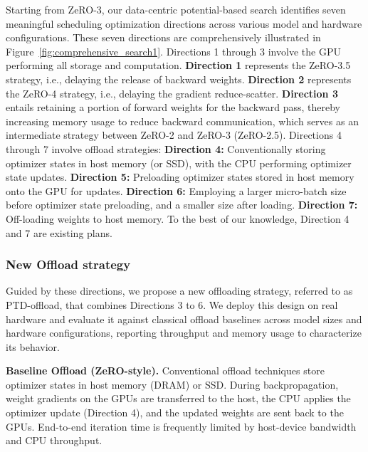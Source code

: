\documentclass[letterpaper,twocolumn,10pt]{article}
\begin{document}
Starting from ZeRO-3, our data-centric potential-based search identifies seven meaningful scheduling optimization directions across various model and hardware configurations. These seven directions are comprehensively illustrated in Figure~\ref{fig:comprehensive_search1}. Directions 1 through 3 involve the GPU performing all storage and computation. \textbf{Direction 1} represents the ZeRO-3.5 strategy, i.e., delaying the release of backward weights. \textbf{Direction 2} represents the ZeRO-4 strategy, i.e., delaying the gradient reduce-scatter. \textbf{Direction 3} entails retaining a portion of forward weights for the backward pass, thereby increasing memory usage to reduce backward communication, which serves as an intermediate strategy between ZeRO-2 and ZeRO-3 (ZeRO-2.5). Directions 4 through 7 involve offload strategies:
\textbf{Direction 4:} Conventionally storing optimizer states in host memory (or SSD), with the CPU performing optimizer state updates.
\textbf{Direction 5:} Preloading optimizer states stored in host memory onto the GPU for updates.
\textbf{Direction 6:} Employing a larger micro-batch size before optimizer state preloading, and a smaller size after loading.
\textbf{Direction 7:} Off-loading weights to host memory. To the best of our knowledge, Direction 4 and 7 are existing plans.

\subsubsection{New Offload strategy} 



Guided by these directions, we propose a new offloading strategy, referred to as PTD-offload, that combines Directions 3 to 6. We deploy this design on real hardware and evaluate it against classical offload baselines across model sizes and hardware configurations, reporting throughput and memory usage to characterize its behavior.

\textbf{Baseline Offload (ZeRO-style).} Conventional offload techniques store optimizer states in host memory (DRAM) or SSD. During backpropagation, weight gradients on the GPUs are transferred to the host, the CPU applies the optimizer update (Direction 4), and the updated weights are sent back to the GPUs. End-to-end iteration time is frequently limited by host-device bandwidth and CPU throughput.

\end{document}
